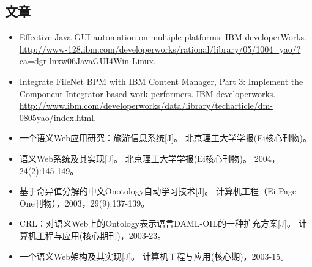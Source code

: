 \documentclass[a4paper]{article}
\begin{document}
\begin{CJK}{UTF8}{gkai}
\section*{文章}
\begin{itemize}
\item Effective Java GUI automation on multiple platforms. IBM developerWorks.
\url{http://www-128.ibm.com/developerworks/rational/library/05/1004_yao/?ca=dgr-lnxw06JavaGUI4Win-Linux}.
\item Integrate FileNet BPM with IBM Content Manager,
Part 3: Implement the Component Integrator-based work performers.
IBM developerworks.
\url{http://www.ibm.com/developerworks/data/library/techarticle/dm-0805yao/index.html}.
\item 一个语义Web应用研究：旅游信息系统{[}J{]}。 北京理工大学学报(Ei核心刊物)。
\item 语义Web系统及其实现{[}J{]}。 北京理工大学学报(Ei核心刊物)。 2004，24(2):145-149。
\item 基于奇异值分解的中文Onotology自动学习技术{[}J{]}。 计算机工程（Ei Page One刊物），2003，29(9):137-139。
\item CRL：对语义Web上的Ontology表示语言DAML-OIL的一种扩充方案{[}J{]}。 计算机工程与应用(核心期刊)，2003-23。
\item 一个语义Web架构及其实现{[}J{]}。 计算机工程与应用(核心期)，2003-15。
\end{itemize}

\end{CJK}
\end{document}
